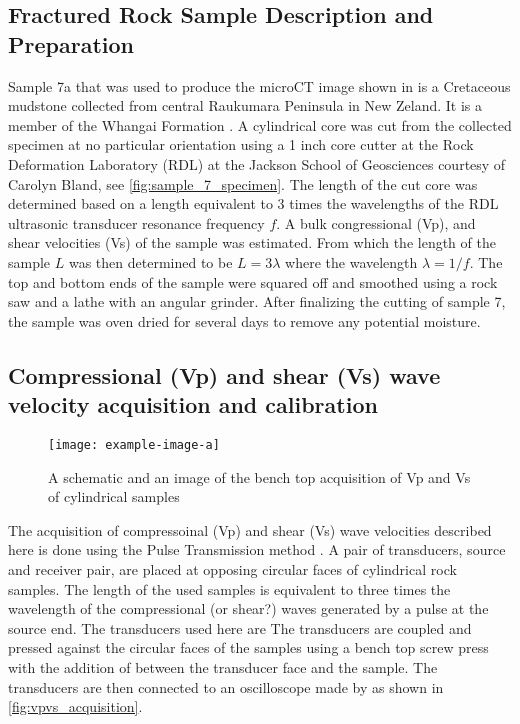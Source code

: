 \documentclass[12pt,titlepage]{article}
\begin{document}
\subsection{Fractured Rock Sample Description and Preparation}
Sample 7a that was used to produce the microCT image shown in  is a Cretaceous mudstone collected from central Raukumara Peninsula in New Zeland. It is a member of the Whangai Formation \cite{Bland2022} . A cylindrical core was cut from the collected specimen at no particular orientation using a 1 inch core cutter at the Rock Deformation Laboratory (RDL) at the Jackson School of Geosciences courtesy of Carolyn Bland, see \autoref{fig:sample_7_specimen}. The length of the cut core was determined based on a length equivalent to 3 times the wavelengths of the RDL ultrasonic transducer resonance frequency $f$. A bulk congressional (Vp), and shear velocities (Vs) of the sample was estimated. From which the length of the sample $L$ was then determined to be $L = 3\lambda$ where the wavelength $\lambda = 1/f$. The top and bottom ends of the sample were squared off and smoothed using a rock saw and a lathe with an angular grinder. After finalizing the cutting of sample 7, the sample was oven dried for several days to remove any potential moisture. 

\subsection{Compressional (Vp) and shear (Vs) wave velocity acquisition and calibration}

\begin{figure}[!h]
\centering
\texttt{[image: example-image-a]}
\caption{A schematic and an image of the bench top acquisition of Vp and Vs of cylindrical samples}
\label{fig:vpvs_acquisition}
\end{figure}

The acquisition of compressoinal (Vp) and shear (Vs) wave velocities described here is done using the Pulse Transmission method \citep{Birch1960}. A pair of transducers, source and receiver pair, are placed at opposing circular faces of cylindrical rock samples. The length of the used samples is equivalent to three times the wavelength of the compressional (or shear?) waves generated by a pulse at the source end. The transducers used here are  The transducers are coupled and pressed against the circular faces of the samples using a bench top screw press with the addition of  between the transducer face and the sample. The transducers are then connected to an oscilloscope made by  as shown in \autoref{fig:vpvs_acquisition}.
\end{document}
